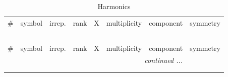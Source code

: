 \documentclass[fleqn,10pt,landscape]{jsarticle}
\begin{document}
\renewcommand{\arraystretch}{1.6}
\begin{longtable}[l]{clcccccl}
\captionsetup{justification=raggedright, singlelinecheck=off}
\caption{Harmonics}
 \\
 \hline \hline
\# & symbol & irrep. & rank & X & multiplicity & component & symmetry \\ \hline \endfirsthead

\multicolumn{7}{l}{\tablename\ \thetable{}} \\
 \hline \hline
\# & symbol & irrep. & rank & X & multiplicity & component & symmetry \\ \hline \endhead

 \hline \hline
\multicolumn{7}{r}{\footnotesize\it continued ...} \\ \endfoot

 \hline \hline
\multicolumn{7}{r}{} \\ \endlastfoot


\end{longtable}
\end{document}
